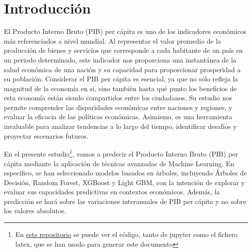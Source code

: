\documentclass[12pt]{article}
\begin{document}
\tableofcontents

\newpage






\section{Introducción}

El Producto Interno Bruto (PIB) per cápita es uno de los indicadores económicos más referenciados a nivel mundial. Al representar el valor promedio de la producción de bienes y servicios que corresponde a cada habitante de un país en un periodo determinado, este indicador nos proporciona una instantánea de la salud económica de una nación y su capacidad para proporcionar prosperidad a su población. Considerar el PIB per cápita es esencial, ya que no sólo refleja la magnitud de la economía en sí, sino también hasta qué punto los beneficios de esta economía están siendo compartidos entre los ciudadanos. Su estudio nos permite comprender las disparidades económicas entre naciones y regiones, y evaluar la eficacia de las políticas económicas. Asimismo, es una herramienta invaluable para analizar tendencias a lo largo del tiempo, identificar desafíos y proyectar escenarios futuros.

En el presente estudio\footnote{En \href{https://github.com/gustavovargas/ml_aplicado_ccss}{este repositorio} se puede ver el código, tanto de jupyter como el fichero latex, que se han usado para generar este documento}, vamos a predecir el Producto Interno Bruto (PIB) per cápita mediante la aplicación de técnicas avanzadas de Machine Learning. En específico, se han seleccionado modelos basados en árboles, incluyendo Árboles de Decisión, Random Forest, XGBoost y Light GBM, con la intención de explorar y evaluar sus capacidades predictivas en contextos económicos. Además, la predicción se hará sobre las variaciones interanuales de PIB per cápita y no sobre los valores absolutos. 
\end{document}
